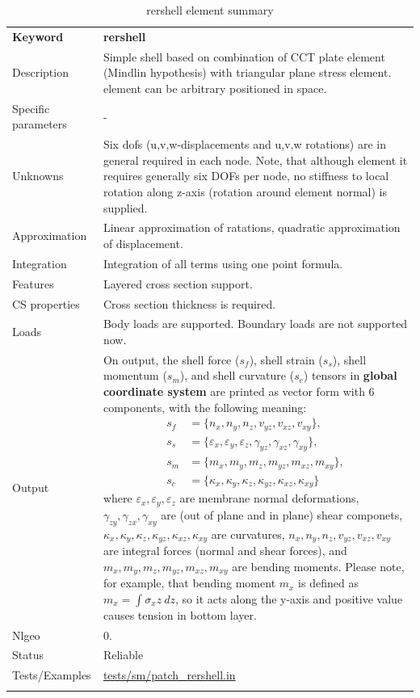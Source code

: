 \documentclass[a4paper]{article}
\newcommand{\param}[1]{\texttt{#1}} %
\newcommand{\templabel}{}%
\newcommand{\tempcaption}{}%
\newcounter{nelpar}
\newenvironment{elementsummary}[5]{%
  \gdef\tempcaption{#4}%
  \gdef\templabel{#5}%
  \setcounter{nelpar}{0}%
  \begin{center} %
    \begin{table}[!htb] %
      \begin{tabular}{|l|p{9cm}|}\hline %
        {\bf Keyword} & \bf{#1}\\ %
        {Description} & {#2}\\ %
        {Specific parameters} & {#3}\\ \hline %
}{
  \\ \hline %
      \end{tabular}%
      \caption{\tempcaption}%
      \label{\templabel}%
    \end{table}%
  \end{center}%
}
\newcommand{\elementParam}[1]{%
  \ifthenelse{\value{nelpar}>0} %
             {&{#1}}%
             {\setcounter{nelpar}{1}Parameters&{#1}}%
             \\%
}
\newcommand{\elementDescription}[2]{{#1} & {#2}\\}
\begin{document}
\begin{elementsummary}{rershell}{Simple shell based on combination of CCT plate element (Mindlin hypothesis) with triangular plane stress element. element can be arbitrary positioned in space.}{-}{rershell element summary}{rershellsummary}
\elementDescription{Unknowns}{Six dofs (u,v,w-displacements and u,v,w rotations) are in general required in each node. Note, that although element it requires generally six DOFs per node, no stiffness to local rotation along z-axis (rotation around element normal) is supplied.}
\elementDescription{Approximation}{Linear approximation of ratations, quadratic approximation of displacement.}
\elementDescription{Integration}{Integration of all terms using one point formula.}
\elementDescription{Features}{Layered cross section support.}
\elementDescription{CS properties}{Cross section thickness is required.}
\elementDescription{Loads}{Body loads are supported. Boundary loads are not supported now.}
\elementDescription{Output}{On output, the shell force ($s_f$), shell strain ($s_s$), shell momentum ($s_m$), and shell curvature ($s_c$) tensors in \textbf{global coordinate system} are printed as vector form with 6 components, with the following meaning:
\begin{align*}
s_f &= \{n_x, n_y, n_z, v_{yz}, v_{xz}, v_{xy}\},\\
s_s &= \{\varepsilon_x, \varepsilon_y, \varepsilon_z, \gamma_{yz}, \gamma_{xz}, \gamma_{xy}\},\\
s_m &= \{m_x, m_y, m_z, m_{yz}, m_{xz}, m_{xy}\},\\
s_c &= \{\kappa_x, \kappa_y, \kappa_z, \kappa_{yz}, \kappa_{xz}, \kappa_{xy}\}
\end{align*}
where $\varepsilon_x, \varepsilon_y, \varepsilon_z$ are membrane normal deformations, $\gamma_{zy}, \gamma_{zx}, \gamma_{xy}$ are (out of plane and in plane) shear componets, $\kappa_x, \kappa_y, \kappa_z, \kappa_{yz}, \kappa_{xz}, \kappa_{xy}$ are curvatures, $n_x, n_y, n_z, v_{yz}, v_{xz}, v_{xy}$ are integral forces (normal and shear forces), and $m_x, m_y, m_z, m_{yz}, m_{xz}, m_{xy}$ are bending moments. 
Please note, for example, that bending moment $m_x$ is defined as $m_x=\int \sigma_x z\ dz$, so it acts along the y-axis and positive value causes tension in bottom layer.}
\elementDescription{Nlgeo}{0.}
\elementDescription{Status}{Reliable}
\elementDescription{Tests/Examples}{\href{https://github.com/oofem/oofem/blob/devel/tests/sm/patch\_rershell.in}{tests/sm/patch\_rershell.in}}
\end{elementsummary}
\end{document}
